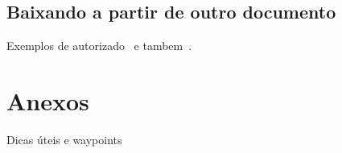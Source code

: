 \documentclass[a4paper, 12pt, twoside]{scrreprt}
\begin{document}
\section{Baixando a partir de outro documento}
Exemplos de autorizado~\cite{dirac} e tambem~\cite{einstein}.



%
%
\printbibliography[heading=bibintoc] %


%
%
\appendix
\renewcommand{\chaptername}{Anexos}
\chapter{Anexos}
Dicas úteis e waypoints
\end{document}
